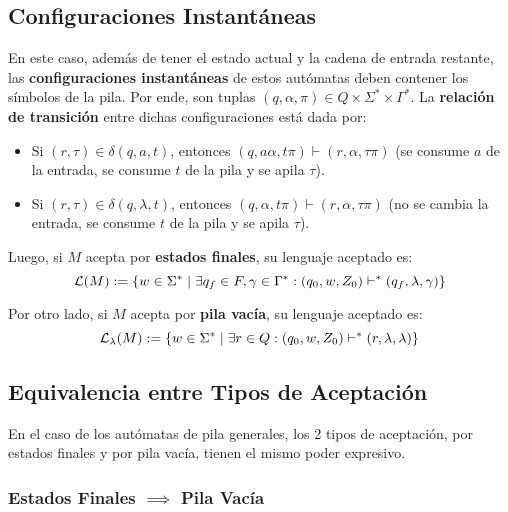 \subsection{Configuraciones Instantáneas}

En este caso, además de tener el estado actual y la cadena de entrada restante, las \textbf{configuraciones instantáneas} de estos autómatas deben contener los símbolos de la pila. Por ende, son tuplas $(q, \alpha, \pi) \in Q \times \Sigma^* \times \Gamma^*$. La \textbf{relación de transición} entre dichas configuraciones está dada por:
\begin{itemize}
    \item Si $(r, \tau) \in \delta(q, a, t)$, entonces $(q, a \alpha, t \pi) \vdash (r, \alpha, \tau \pi)$ (se consume $a$ de la entrada, se consume $t$ de la pila y se apila $\tau$).
    \item Si $(r, \tau) \in \delta(q, \lambda, t)$, entonces $(q, \alpha, t \pi) \vdash (r, \alpha, \tau \pi)$ (no se cambia la entrada, se consume $t$ de la pila y se apila $\tau$). 
\end{itemize}

Luego, si $M$ acepta por \textbf{estados finales}, su lenguaje aceptado es:
$$
    \mathcal{L}(M) := \{w \in \Sigma^* \mid \exists q_f \in F, \gamma \in \Gamma^* :  (q_0, w, Z_0) \vdash^* (q_f, \lambda, \gamma)\}
$$

Por otro lado, si $M$ acepta por \textbf{pila vacía}, su lenguaje aceptado es:
$$
    \mathcal{L}_\lambda(M) := \{w \in \Sigma^* \mid \exists r \in Q :  (q_0, w, Z_0) \vdash^* (r, \lambda, \lambda)\}
$$

\subsection{Equivalencia entre Tipos de Aceptación}

En el caso de los autómatas de pila generales, los 2 tipos de aceptación, por estados finales y por pila vacía, tienen el mismo poder expresivo.

\subsubsection{Estados Finales $\implies$ Pila Vacía}

